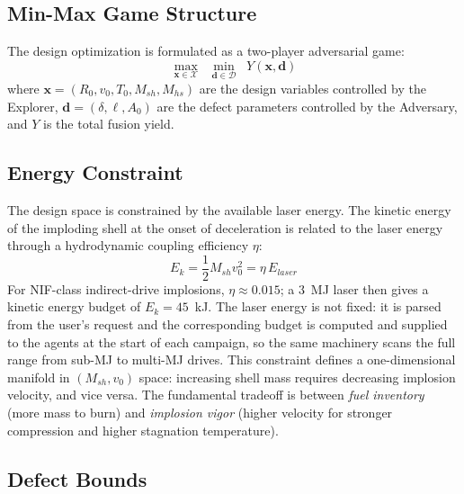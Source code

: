 \documentclass[conference]{IEEEtran}
\begin{document}
\subsection{Min-Max Game Structure}

The design optimization is formulated as a two-player adversarial game:
\begin{equation}
\max_{\mathbf{x} \in \mathcal{X}} \;\; \min_{\mathbf{d} \in \mathcal{D}} \;\; Y(\mathbf{x}, \mathbf{d})
\label{eq:minmax}
\end{equation}
where $\mathbf{x} = (R_0, v_0, T_0, M_{sh}, M_{hs})$ are the design variables controlled by the Explorer, $\mathbf{d} = (\delta, \ell, A_0)$ are the defect parameters controlled by the Adversary, and $Y$ is the total fusion yield.

\subsection{Energy Constraint}

The design space is constrained by the available laser energy.  The kinetic energy of the imploding shell at the onset of deceleration is related to the laser energy through a hydrodynamic coupling efficiency $\eta$:
\begin{equation}
E_k = \frac{1}{2}M_{sh} v_0^2 = \eta \, E_{laser}
\label{eq:energy_constraint}
\end{equation}
For NIF-class indirect-drive implosions, $\eta \approx 0.015$; a $3$~MJ laser then gives a kinetic energy budget of $E_k = 45$~kJ.  The laser energy is not fixed: it is parsed from the user's request and the corresponding budget is computed and supplied to the agents at the start of each campaign, so the same machinery scans the full range from sub-MJ to multi-MJ drives.  This constraint defines a one-dimensional manifold in $(M_{sh}, v_0)$ space: increasing shell mass requires decreasing implosion velocity, and vice versa.  The fundamental tradeoff is between \textit{fuel inventory} (more mass to burn) and \textit{implosion vigor} (higher velocity for stronger compression and higher stagnation temperature).

\subsection{Defect Bounds}
\end{document}
